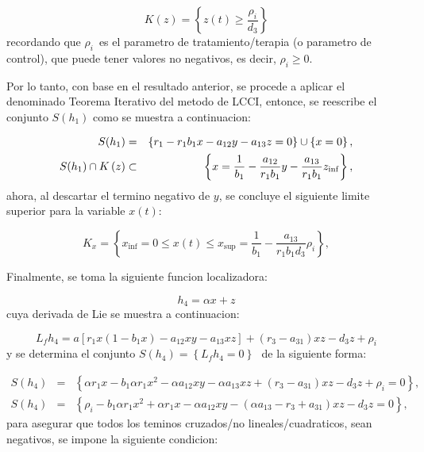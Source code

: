 \documentclass[letterpaper,11pt]{article}
\begin{document}
\begin{equation*}
K\left( z\right) =\left\{ z\left( t\right) \geq \frac{\rho _{i}}{d_{3}}%
\right\}
\end{equation*}%
recordando que $\rho _{i}$\bigskip\ es el parametro de tratamiento/terapia
(o parametro de control), que puede tener valores no negativos, es decir, $%
\rho _{i}\geq 0$.

Por lo tanto, con base en el resultado anterior, se procede a aplicar el
denominado Teorema Iterativo del metodo de LCCI, entonce, se reescribe el
conjunto $S\left( h_{1}\right) $ como se muestra a continuacion:

\begin{eqnarray*}
S(h_{1}) &=&\left\{ r_{1}-r_{1}b_{1}x-a_{12}y-a_{13}z=0\right\} \cup \left\{
x=0\right\} , \\
S(h_{1})\cap K\left( z\right) &\subset &\left\{ x=\frac{1}{b_{1}}-\frac{%
a_{12}}{r_{1}b_{1}}y-\frac{a_{13}}{r_{1}b_{1}}z_{\inf }\right\} ,
\end{eqnarray*}%
ahora, al descartar el termino negativo de $y$, se concluye el siguiente
limite superior para la variable $x\left( t\right) $:

\begin{equation*}
K_{x}=\left\{ x_{\inf }=0\leq x\left( t\right) \leq x_{\sup }=\frac{1}{b_{1}}%
-\frac{a_{13}}{r_{1}b_{1}d_{3}}\rho _{i}\right\} ,
\end{equation*}

Finalmente, se toma la siguiente funcion localizadora:

\begin{equation*}
h_{4}=\alpha x+z
\end{equation*}%
cuya derivada de Lie se muestra a continuacion:

\begin{equation*}
L_{f}h_{4}=a\left[ r_{1}x(1-b_{1}x)-a_{12}xy-a_{13}xz\right] +\left(
r_{3}-a_{31}\right) xz-d_{3}z+\rho _{i}
\end{equation*}%
y se determina el conjunto $S\left( h_{4}\right) =\left\{
L_{f}h_{4}=0\right\} \,$\ de la siguiente forma:

\begin{eqnarray*}
S\left( h_{4}\right) &=&\left\{ \alpha r_{1}x-b_{1}\alpha r_{1}x^{2}-\alpha
a_{12}xy-\alpha a_{13}xz+\left( r_{3}-a_{31}\right) xz-d_{3}z+\rho
_{i}=0\right\} , \\
S\left( h_{4}\right) &=&\left\{ \rho _{i}-b_{1}\alpha r_{1}x^{2}+\alpha
r_{1}x-\alpha a_{12}xy-\left( \alpha a_{13}-r_{3}+a_{31}\right)
xz-d_{3}z=0\right\} ,
\end{eqnarray*}%
para asegurar que todos los teminos cruzados/no lineales/cuadraticos, sean
negativos, se impone la siguiente condicion:
\end{document}
